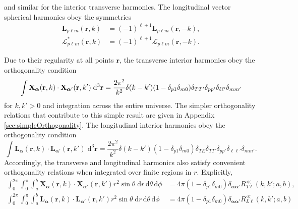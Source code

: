 \documentclass{article}
\begin{document}
and similar for the interior transverse harmonics. The longitudinal vector spherical harmonics obey the symmetries
\begin{equation}
\begin{split}
\mathbf{L}_{p\ell m}(\mathbf{r},k) &= (-1)^{\ell+1}\mathbf{L}_{p\ell m}(\mathbf{r},-k),\\
\bm{\mathcal{L}}_{p\ell m}^*(\mathbf{r},k) &= (-1)^{\ell+1}\bm{\mathcal{L}}_{p\ell m}(\mathbf{r},-k).
\end{split}
\end{equation}

Due to their regularity at all points $\mathbf{r}$, the transverse interior harmonics obey the orthogonality condition
\begin{equation}\label{eq:vectorSphericalHarmonicOrthogonality}
\int \mathbf{X}_{\bm{\alpha}}(\mathbf{r},k)\cdot\mathbf{X}_{\bm{\alpha}'}(\mathbf{r},k')\;\mathrm{d}^3\mathbf{r} = \frac{2\pi^2}{k^2}\delta(k - k')(1 - \delta_{p1}\delta_{m0})\delta_{TT'}\delta_{pp'}\delta_{\ell\ell'}\delta_{mm'}\\
\end{equation}
for $k,k' > 0$ and integration across the entire universe. The simpler orthogonality relations that contribute to this simple result are given in Appendix \ref{sec:simpleOrthogonality}. The longitudinal interior harmonics obey the orthogonality condition
\begin{equation}\label{eq:longitudinalHarmonicOrthogonality}
\int\mathbf{L}_{\bm{\alpha}}(\mathbf{r},k)\cdot\mathbf{L}_{\bm{\alpha}'}(\mathbf{r},k')\;\mathrm{d}^3\mathbf{r} = \frac{2\pi^2}{k^2}\delta(k - k')(1 - \delta_{p1}\delta_{m0})\delta_{TE}\delta_{TT'}\delta_{pp'}\delta_{\ell\ell'}\delta_{mm'}.
\end{equation}
Accordingly, the transverse and longitudinal harmonics also satisfy convenient orthogonality relations when integrated over finite regions in $r$. Explicitly,
\begin{equation}\label{eq:vectorSphericalHarmonicOrthogonalityConditionFinite}
\begin{split}
\int_0^{2\pi}\int_0^\pi\int_a^b\mathbf{X}_{\bm{\alpha}}(\mathbf{r},k)\cdot\mathbf{X}_{\bm{\alpha}'}(\mathbf{r},k')r^2\sin\theta\;\mathrm{d}r\,\mathrm{d}\theta\,\mathrm{d}\phi &= 4\pi(1 - \delta_{p1}\delta_{m0})\delta_{\bm{\alpha}\bm{\alpha}'}R_{T\ell}^{\ll}(k,k';a,b),\\
\int_0^{2\pi}\int_0^\pi\int_a^b\mathbf{L}_{\bm{\alpha}}(\mathbf{r},k)\cdot\mathbf{L}_{\bm{\alpha}'}(\mathbf{r},k')r^2\sin\theta\;\mathrm{d}r\,\mathrm{d}\theta\,\mathrm{d}\phi &= 4\pi(1 - \delta_{p1}\delta_{m0})\delta_{\bm{\alpha}\bm{\alpha}'}R_{L\ell}^{\ll}(k,k';a,b)
\end{split}
\end{equation}
\end{document}
